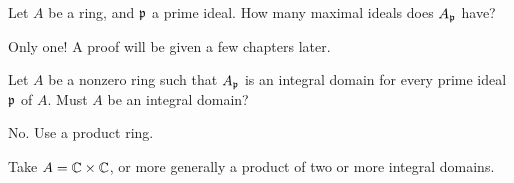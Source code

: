 \begin{sproblem}
	Let $A$ be a ring, and $\mathfrak p$ a prime ideal.
	How many maximal ideals does $A_\mathfrak p$ have?
	\begin{hint}
		Only one!
		A proof will be given a few chapters later.
	\end{hint}
\end{sproblem}


\begin{problem}
	Let $A$ be a nonzero ring such that $A_\mathfrak p$ is an integral domain
	for every prime ideal $\mathfrak p$ of $A$.
	Must $A$ be an integral domain?
	\begin{hint}
		No. Use a product ring.
	\end{hint}
	\begin{sol}
		Take $A = \mathbb C \times \mathbb C$, or more generally a product of two or more integral domains.
	\end{sol}
\end{problem}
